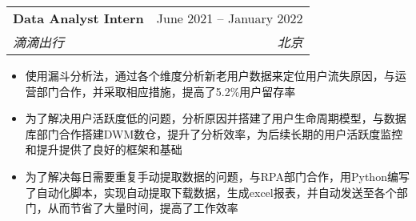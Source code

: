 \documentclass[letterpaper,11pt]{ctexart}
\makeatletter
\newcommand{\resumeItem}[1]{
  \item\small{
    {#1 \vspace{-2pt}}
  }
}
\newcommand{\resumeSubheading}[4]{
  \vspace{-2pt}\item
    \begin{tabular*}{0.97\textwidth}[t]{l@{\extracolsep{\fill}}r}
      \textbf{#1} & #2 \\
      \textit{\small#3} & \textit{\small #4} \\
    \end{tabular*}\vspace{-7pt}
}
\newcommand{\resumeSubSubheading}[2]{
    \item
    \begin{tabular*}{0.97\textwidth}{l@{\extracolsep{\fill}}r}
      \textit{\small#1} & \textit{\small #2} \\
    \end{tabular*}\vspace{-7pt}
}
\newcommand{\resumeSubHeadingListEnd}{\end{itemize}}
\newcommand{\resumeItemListStart}{\begin{itemize}}
\newcommand{\resumeItemListEnd}{\end{itemize}\vspace{-5pt}}
\makeatother
\begin{document}
    \resumeSubheading
      {Data Analyst Intern}{June 2021 -- January 2022}
      {滴滴出行}{北京}
      \resumeItemListStart
        \resumeItem{使用漏斗分析法，通过各个维度分析新老用户数据来定位用户流失原因，与运营部门合作，并采取相应措施，提高了5.2\%用户留存率}
        \resumeItem{为了解决用户活跃度低的问题，分析原因并搭建了用户生命周期模型，与数据库部门合作搭建DWM数仓，提升了分析效率，为后续长期的用户活跃度监控和提升提供了良好的框架和基础}
        \resumeItem{为了解决每日需要重复手动提取数据的问题，与RPA部门合作，用Python编写了自动化脚本，实现自动提取下载数据，生成excel报表，并自动发送至各个部门，从而节省了大量时间，提高了工作效率}
      \resumeItemListEnd
      


\end{document}
